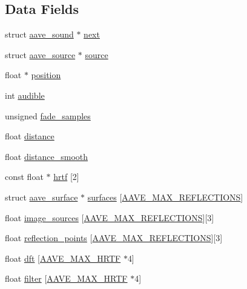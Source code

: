 \subsection*{Data Fields}
\begin{DoxyCompactItemize}
\item 
struct \hyperlink{structaave__sound}{aave\-\_\-sound} $\ast$ \hyperlink{structaave__sound_a3e64f8a8399ae64de4d5ebd266fd7eb3}{next}
\item 
struct \hyperlink{structaave__source}{aave\-\_\-source} $\ast$ \hyperlink{structaave__sound_ac56f4ab64afcb0668832301110e3bfdb}{source}
\item 
float $\ast$ \hyperlink{structaave__sound_a04a3c01ca0a54233061a2e2ebac1b464}{position}
\item 
int \hyperlink{structaave__sound_ad452524fd55cf2d6490a7a7b9a1c85b7}{audible}
\item 
unsigned \hyperlink{structaave__sound_ad4ce9aa0eca1519c53465d9704fd6efa}{fade\-\_\-samples}
\item 
float \hyperlink{structaave__sound_abefe2c52139bd0fcad1413d82ce1635e}{distance}
\item 
float \hyperlink{structaave__sound_a32919a754ba68db947c74eaadad979c2}{distance\-\_\-smooth}
\item 
const float $\ast$ \hyperlink{structaave__sound_a01efd817868c055126f2aea812a44d1a}{hrtf} \mbox{[}2\mbox{]}
\item 
struct \hyperlink{structaave__surface}{aave\-\_\-surface} $\ast$ \hyperlink{structaave__sound_a4d8cbff05fc5af52a18ac1c9015cfc97}{surfaces} \mbox{[}\hyperlink{aave_8h_a5cc7807cca10cf0933038ad388171181}{A\-A\-V\-E\-\_\-\-M\-A\-X\-\_\-\-R\-E\-F\-L\-E\-C\-T\-I\-O\-N\-S}\mbox{]}
\item 
float \hyperlink{structaave__sound_a0627e96d3a12a30fec75a65cc6f402a7}{image\-\_\-sources} \mbox{[}\hyperlink{aave_8h_a5cc7807cca10cf0933038ad388171181}{A\-A\-V\-E\-\_\-\-M\-A\-X\-\_\-\-R\-E\-F\-L\-E\-C\-T\-I\-O\-N\-S}\mbox{]}\mbox{[}3\mbox{]}
\item 
float \hyperlink{structaave__sound_a06b4b094d9e92084c8b10a99bfe74e5e}{reflection\-\_\-points} \mbox{[}\hyperlink{aave_8h_a5cc7807cca10cf0933038ad388171181}{A\-A\-V\-E\-\_\-\-M\-A\-X\-\_\-\-R\-E\-F\-L\-E\-C\-T\-I\-O\-N\-S}\mbox{]}\mbox{[}3\mbox{]}
\item 
float \hyperlink{structaave__sound_aa94c4070b91409c6cac4189fc599f6f9}{dft} \mbox{[}\hyperlink{aave_8h_a19ea3a18eb313fc3b825f522245d19d3}{A\-A\-V\-E\-\_\-\-M\-A\-X\-\_\-\-H\-R\-T\-F} $\ast$4\mbox{]}
\item 
float \hyperlink{structaave__sound_a6e27d4a259442303d940706031c2ee83}{filter} \mbox{[}\hyperlink{aave_8h_a19ea3a18eb313fc3b825f522245d19d3}{A\-A\-V\-E\-\_\-\-M\-A\-X\-\_\-\-H\-R\-T\-F} $\ast$4\mbox{]}
\end{DoxyCompactItemize}


